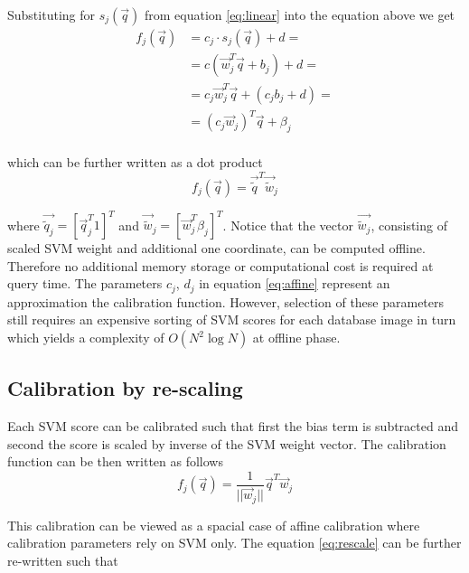      \noindent
     Substituting for $s_j(\vec{q})$ from equation \eqref{eq:linear} into the equation above we get
     \begin{align}
         f_j(\vec{q})  & = c_j\cdot s_j(\vec{q}) + d=\\ \nonumber
                       & = c (\vec{w}_j^T \vec{q}+b_j)+d =\\ \nonumber
                       & = c_j\vec{w}_j^T \vec{q}+ (c_j b_j+d)=\\ \nonumber
                       & = (c_j\vec{w}_j)^T \vec{q} + \beta_j \\ \nonumber
         \label{eq:affiine}
     \end{align}

     \noindent
     which can be further written as a  dot product
     \begin{equation}
       f_j(\vec{q}) = \vec{\widetilde{q}}^T \vec{\widetilde{w}}_j
     \end{equation}
     
     \noindent
     where $\vec{\tilde{q}_j}=[\vec{q}_j^T 1]^T$ and $\vec{\widetilde{w}}_j = [\vec{w}_j^T \beta_j]^T$. Notice that the vector $\vec{\tilde{w}_j}$, consisting of scaled SVM weight and additional one coordinate, can be computed offline. Therefore no additional memory storage or computational cost is required at query time. The parameters $c_j$, $d_j$ in equation \eqref{eq:affine} represent an approximation the calibration function. However, selection of these parameters still requires an expensive sorting of SVM scores for each database image in turn which yields a complexity of $O(N^2 \log{N})$ at offline phase.

   \subsection{Calibration by re-scaling}
      Each SVM score can be calibrated such that first the bias term is subtracted and second the score is scaled by inverse of the SVM weight vector. The calibration function can be then written as follows
      \begin{equation}
         f_j(\vec{q}) = \dfrac{1}{||\vec{w}_j||}\vec{q}^T\vec{w}_j
         \label{eq:rescale}
      \end{equation}

      This calibration can be viewed as a spacial case of affine calibration where calibration parameters rely on SVM only. The equation \eqref{eq:rescale} can be further re-written such that
      
